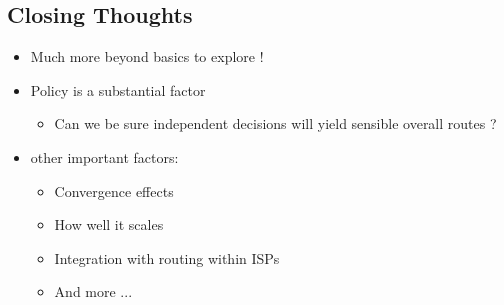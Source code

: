 \documentclass[12pt]{ctexart}   %
\begin{document}
	\subsection{ Closing Thoughts }
	\begin{itemize}
		\item Much more beyond basics to explore !
		\item Policy is a substantial factor
		\begin{itemize}
			\item Can we be sure independent decisions will yield sensible overall routes ?
		\end{itemize}
		
		\item other important factors:
		\begin{itemize}
			\item Convergence effects
			\item How well it scales
			\item Integration with routing within ISPs
			\item And more ...
		\end{itemize}
	\end{itemize}


	
\end{document}
